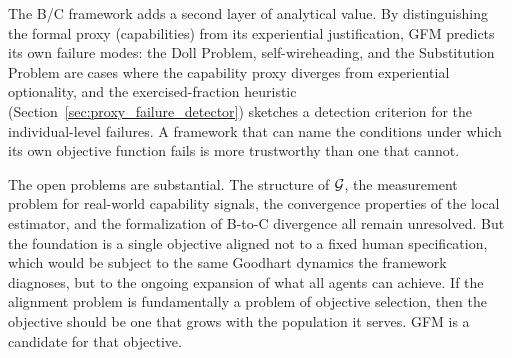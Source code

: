 The B/C framework adds a second layer of analytical value. By distinguishing
the formal proxy (capabilities) from its experiential justification, GFM
predicts its own failure modes: the Doll Problem, self-wireheading, and the
Substitution Problem are cases where the capability proxy diverges from
experiential optionality, and the exercised-fraction heuristic
(Section~\ref{sec:proxy_failure_detector}) sketches a detection criterion for
the individual-level failures. A framework that can name the conditions under
which its own objective function fails is more trustworthy than one that
cannot.

The open problems are substantial. The structure of $\mathcal{G}$, the measurement
problem for real-world capability signals, the convergence properties of the
local estimator, and the formalization of B-to-C divergence all remain
unresolved. But the foundation is a single objective aligned not to a fixed
human specification, which would be subject to the same Goodhart dynamics the
framework diagnoses, but to the ongoing expansion of what all agents can
achieve. If the alignment problem is fundamentally a problem of objective
selection, then the objective should be one that grows with the population it
serves. GFM is a candidate for that objective.
